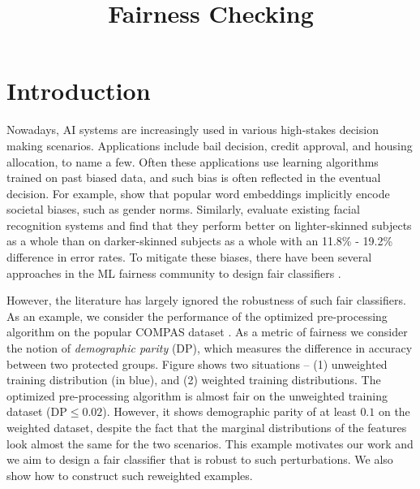 \documentclass{article}
\title{{\bfseries Fairness Checking} }
\newcommand{\kibitz}[2]{\ifnum\Comments=1{\color{#1}{#2}}\fi}
\newcommand{\dm}[1]{\kibitz{magenta}{[Deb: #1]}}
\begin{document}
\maketitle


\section{Introduction}
\dm{
	Rough sketch of the introduction:
\begin{itemize}
\item Usual Motivation for fairness
\item Why do we care about distributional robustness in this setting?
\item Connection with verification literature
\item Related work -- (a) fairness in classification, (b) distributionally robust optimization,
\item Contributions -- (a) distributional robustness for fairness, (b) general framework to design such a classifier, (c) faster approximate minmax solution, (d) simulation results
\end{itemize}
}
Nowadays, AI systems are increasingly used in various high-stakes decision making scenarios. Applications include bail decision, credit approval, and housing allocation, to name a few. Often these applications use learning algorithms trained on past biased data, and such bias is often reflected in the eventual decision. For example, \cite{BCZS+16} show that popular word embeddings implicitly encode societal biases, such as gender norms. Similarly, \cite{BG18} evaluate existing facial recognition systems and find that they perform better on lighter-skinned subjects as a whole than on darker-skinned subjects as a whole with an 11.8\% - 19.2\% difference in error rates. To mitigate these biases, there have been several approaches in the ML fairness community to design fair classifiers \cite{ZWSP+13,HPS16,ABDL+18}. 

However, the literature has largely ignored the robustness of such fair classifiers. As an example, we consider the performance of the optimized pre-processing algorithm \cite{CWVN+17} on the popular COMPAS dataset \cite{COMPAS}. As a metric of fairness we consider the notion of \emph{demographic parity} (DP), which measures the difference in accuracy between two protected groups. Figure shows two situations -- (1) unweighted training distribution (in blue), and (2) weighted training distributions. The optimized pre-processing algorithm \cite{CWVN+17} is almost fair on the unweighted training dataset ($\textrm{DP} \leq 0.02$). However, it shows demographic parity of at least $0.1$ on the weighted dataset, despite the fact that the marginal distributions of the features look almost the same for the two scenarios. This example motivates our work and we aim to design a fair classifier that is robust to such perturbations. We also show how to construct such reweighted examples.
\end{document}
